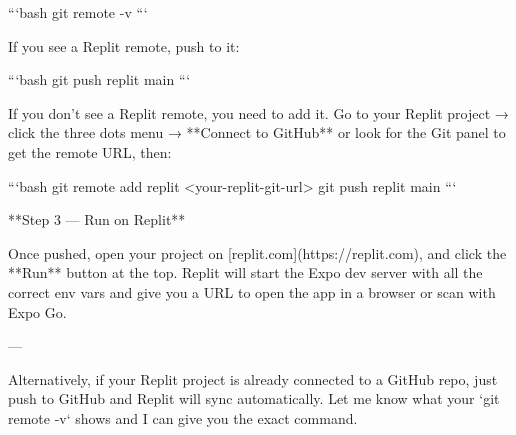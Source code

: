 ```bash
git remote -v
```

If you see a Replit remote, push to it:

```bash
git push replit main
```

If you don't see a Replit remote, you need to add it. Go to your Replit project → click the three dots menu → **Connect to GitHub** or look for the Git panel to get the remote URL, then:

```bash
git remote add replit <your-replit-git-url>
git push replit main
```

**Step 3 — Run on Replit**

Once pushed, open your project on [replit.com](https://replit.com), and click the **Run** button at the top. Replit will start the Expo dev server with all the correct env vars and give you a URL to open the app in a browser or scan with Expo Go.

---

Alternatively, if your Replit project is already connected to a GitHub repo, just push to GitHub and Replit will sync automatically. Let me know what your `git remote -v` shows and I can give you the exact command.